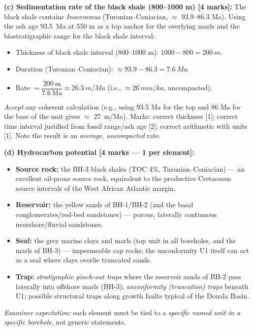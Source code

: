 \documentclass[11pt]{article}
\begin{document}
\begin{corrige}
\textbf{(c) Sedimentation rate of the black shale (800--1000 m) [4 marks]:}
The black shale contains \emph{Inoceramus} (Turonian--Coniacian, $\approx$ 93.9--86.3 Ma). Using the ash age \SI{93.5}{Ma} at 550 m as a top anchor for the overlying marls and the biostratigraphic range for the black shale interval:
\begin{itemize}
\item Thickness of black shale interval (800--1000 m): $1000 - 800 = \SI{200}{m}$.
\item Duration (Turonian--Coniacian): $\approx 93.9 - 86.3 = \SI{7.6}{Ma}$.
\item Rate $= \dfrac{200\ \text{m}}{7.6\ \text{Ma}} \approx \SI{26.3}{m/Ma}$ (i.e., $\approx \SI{26}{mm/ka}$, uncompacted).
\end{itemize}
\emph{Accept} any coherent calculation (e.g., using 93.5 Ma for the top and 86 Ma for the base of the unit gives $\approx$ \SI{27}{m/Ma}). Marks: correct thickness [1]; correct time interval justified from fossil range/ash age [2]; correct arithmetic with units [1]. Note the result is an \emph{average, uncompacted} rate.

\textbf{(d) Hydrocarbon potential [4 marks — 1 per element]:}
\begin{itemize}
\item \textbf{Source rock:} the BH-3 black shales (TOC 4\%, Turonian--Coniacian) — an excellent oil-prone source rock, equivalent to the productive Cretaceous source intervals of the West African Atlantic margin.
\item \textbf{Reservoir:} the yellow sands of BH-1/BH-2 (and the basal conglomerates/red-bed sandstones) — porous, laterally continuous nearshore/fluvial sandstones.
\item \textbf{Seal:} the grey marine clays and marls (top unit in all boreholes, and the marls of BH-3) — impermeable cap rocks; the unconformity U1 itself can act as a seal where clays overlie truncated sands.
\item \textbf{Trap:} \emph{stratigraphic pinch-out traps} where the reservoir sands of BH-2 pass laterally into offshore marls (BH-3); \emph{unconformity (truncation) traps} beneath U1; possible structural traps along growth faults typical of the Douala Basin.
\end{itemize}
\emph{Examiner expectation:} each element must be tied to a \emph{specific named unit in a specific borehole}, not generic statements.
\end{corrige}

\newpage
\end{document}

